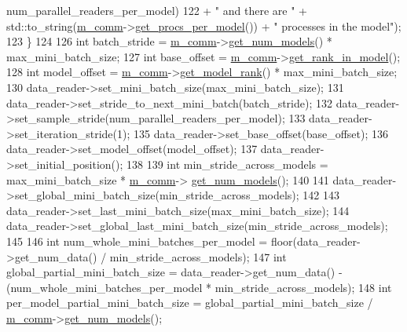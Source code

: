 \begin{DoxyCode}
      num\_parallel\_readers\_per\_model)
122       + \textcolor{stringliteral}{" and there are "} + std::to\_string(\hyperlink{classlbann_1_1generic__io__buffer_a2e4a46c85c8b30e10b1cc5acaa2c4cca}{m\_comm}->\hyperlink{classlbann_1_1lbann__comm_a5755dfdfc6377b4cae5ef8f7819e17de}{get\_procs\_per\_model}()) + \textcolor{stringliteral}{"
       processes in the model"});
123   \}
124 
126   \textcolor{keywordtype}{int} batch\_stride = \hyperlink{classlbann_1_1generic__io__buffer_a2e4a46c85c8b30e10b1cc5acaa2c4cca}{m\_comm}->\hyperlink{classlbann_1_1lbann__comm_aeb8ef8f13bbb324e3e1f656998198f3f}{get\_num\_models}() * max\_mini\_batch\_size;
127   \textcolor{keywordtype}{int} base\_offset  = \hyperlink{classlbann_1_1generic__io__buffer_a2e4a46c85c8b30e10b1cc5acaa2c4cca}{m\_comm}->\hyperlink{classlbann_1_1lbann__comm_a789453454468a3b70de768537c50ca52}{get\_rank\_in\_model}();
128   \textcolor{keywordtype}{int} model\_offset = \hyperlink{classlbann_1_1generic__io__buffer_a2e4a46c85c8b30e10b1cc5acaa2c4cca}{m\_comm}->\hyperlink{classlbann_1_1lbann__comm_a6422f70c92bed0b78179facc52b066f7}{get\_model\_rank}() * max\_mini\_batch\_size;
130   data\_reader->set\_mini\_batch\_size(max\_mini\_batch\_size);
131   data\_reader->set\_stride\_to\_next\_mini\_batch(batch\_stride);
132   data\_reader->set\_sample\_stride(num\_parallel\_readers\_per\_model);
133   data\_reader->set\_iteration\_stride(1);
135   data\_reader->set\_base\_offset(base\_offset);
136   data\_reader->set\_model\_offset(model\_offset);
137   data\_reader->set\_initial\_position();
138 
139   \textcolor{keywordtype}{int} min\_stride\_across\_models = max\_mini\_batch\_size * \hyperlink{classlbann_1_1generic__io__buffer_a2e4a46c85c8b30e10b1cc5acaa2c4cca}{m\_comm}->
      \hyperlink{classlbann_1_1lbann__comm_aeb8ef8f13bbb324e3e1f656998198f3f}{get\_num\_models}();  
140 
141   data\_reader->set\_global\_mini\_batch\_size(min\_stride\_across\_models); 
142 
143   data\_reader->set\_last\_mini\_batch\_size(max\_mini\_batch\_size); 
144   data\_reader->set\_global\_last\_mini\_batch\_size(min\_stride\_across\_models); 
145 
146   \textcolor{keywordtype}{int} num\_whole\_mini\_batches\_per\_model = floor(data\_reader->get\_num\_data() / min\_stride\_across\_models);
147   \textcolor{keywordtype}{int} global\_partial\_mini\_batch\_size = data\_reader->get\_num\_data() - (num\_whole\_mini\_batches\_per\_model * 
      min\_stride\_across\_models);
148   \textcolor{keywordtype}{int} per\_model\_partial\_mini\_batch\_size = global\_partial\_mini\_batch\_size / 
      \hyperlink{classlbann_1_1generic__io__buffer_a2e4a46c85c8b30e10b1cc5acaa2c4cca}{m\_comm}->\hyperlink{classlbann_1_1lbann__comm_aeb8ef8f13bbb324e3e1f656998198f3f}{get\_num\_models}();

\end{DoxyCode}

